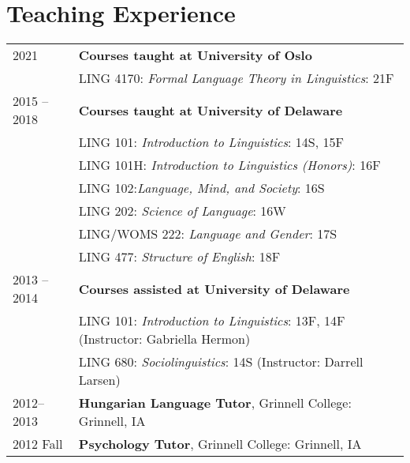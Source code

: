 \documentclass[11pt]{article} %
\begin{document}
\section*{Teaching Experience}
\begin{longtable}{p{1in} p{5.3in}}
	2021 & \textbf{Courses taught at University of Oslo} \\
	& LING 4170: \textit{Formal Language Theory in Linguistics}: 21F\\ [5pt]
	2015 -- 2018 & \textbf{Courses taught at University of Delaware} \\  
	& LING 101: \textit{Introduction to Linguistics}: 14S, 15F 
	\\ 
	& LING 101H: \textit{Introduction to Linguistics (Honors)}: 16F\\
	& LING 102:\textit{Language, Mind, and Society}: 16S \\
	& LING 202: \textit{Science of Language}: 16W \\ 
	& LING/WOMS 222: \textit{Language and Gender}: 17S \\
	& LING 477: \textit{Structure of English}: 18F \\
	[5pt]
	2013 -- 2014 & \textbf{Courses assisted at University of Delaware} \\ 
	& LING 101: \textit{Introduction to Linguistics}: 13F, 14F (Instructor: Gabriella Hermon) \\
	& LING 680: \textit{Sociolinguistics}: 14S (Instructor: Darrell Larsen)\\
	[5pt]
	2012--2013 & \textbf{Hungarian Language Tutor}, Grinnell College: Grinnell, IA \\[5pt]
	2012 Fall & \textbf{Psychology Tutor}, Grinnell College: Grinnell, IA \\
	
\end{longtable}


\end{document}
